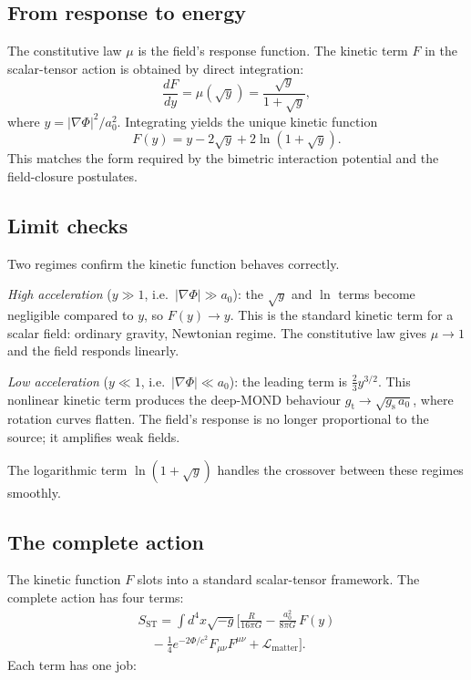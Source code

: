 \documentclass[aps,twocolumn,amsmath,amssymb,reprint,nofootinbib,nobalancelastpage]{revtex4-2}
\begin{document}
\subsection{From response to energy}
\label{subsec:lagrangian}

The constitutive law $\mu$ is the field's response function. The kinetic term $F$ in the scalar-tensor action is obtained by direct integration:
\[
\frac{dF}{dy} = \mu(\sqrt{y}) = \frac{\sqrt{y}}{1+\sqrt{y}},
\]
where $y = |\nabla\Phi|^2/a_0^2$. Integrating yields the unique kinetic function
\begin{equation}
F(y) = y - 2\sqrt{y} + 2\ln(1+\sqrt{y}).
\label{eq:kinetic}
\end{equation}
This matches the form required by the bimetric interaction potential and the field-closure postulates.

\subsection{Limit checks}
\label{subsec:limits}

Two regimes confirm the kinetic function behaves correctly.

\emph{High acceleration} ($y \gg 1$, i.e.\ $|\nabla\Phi| \gg a_0$): the $\sqrt{y}$ and $\ln$ terms become negligible compared to $y$, so $F(y) \to y$. This is the standard kinetic term for a scalar field: ordinary gravity, Newtonian regime. The constitutive law gives $\mu \to 1$ and the field responds linearly.

\emph{Low acceleration} ($y \ll 1$, i.e.\ $|\nabla\Phi| \ll a_0$): the leading term is $\tfrac{2}{3}y^{3/2}$. This nonlinear kinetic term produces the deep-MOND behaviour $g_{\mathrm{t}} \to \sqrt{g_{\mathrm{s}}\,a_0}$, where rotation curves flatten. The field's response is no longer proportional to the source; it amplifies weak fields.

The logarithmic term $\ln(1+\sqrt{y})$ handles the crossover between these regimes smoothly.

\subsection{The complete action}
\label{subsec:complete}

The kinetic function $F$ slots into a standard scalar-tensor framework. The complete action has four terms:
\begin{equation}
\begin{split}
S_{\mathrm{ST}} = \int d^4x \sqrt{-g} \bigg[ \frac{R}{16\pi G} - \frac{a_0^2}{8\pi G}\,F(y) \\
\quad - \frac{1}{4}e^{-2\Phi/c^2} F_{\mu\nu}F^{\mu\nu} + \mathcal{L}_{\mathrm{matter}} \bigg].
\end{split}
\label{eq:action}
\end{equation}
Each term has one job:
\end{document}
